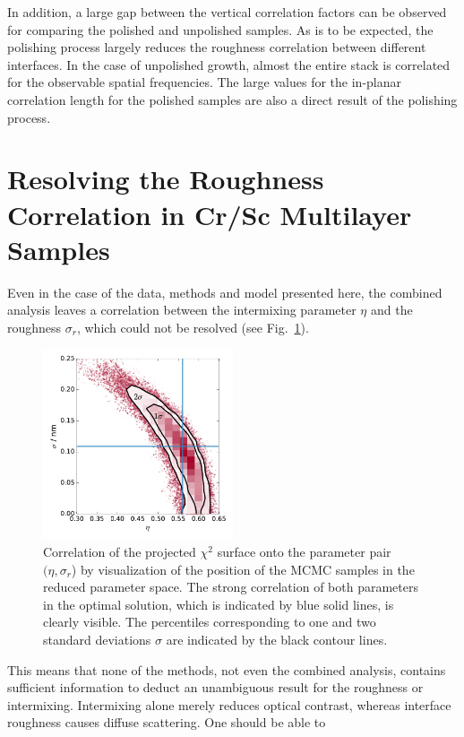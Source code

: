 In addition, a large gap between the vertical correlation factors can be observed for comparing the polished and unpolished samples. As is to be expected, the polishing process largely reduces the roughness correlation between different interfaces. In the case of unpolished growth, almost the entire stack is correlated for the observable spatial frequencies. The large values for the in-planar correlation length for the polished samples are also a direct result of the polishing process. 


\section{Resolving the Roughness Correlation in Cr/Sc Multilayer Samples}
Even in the case of the data, methods and model presented here, the combined 
analysis leaves a correlation between the intermixing parameter $\eta$ and the 
roughness $\sigma_r$, which could not be resolved (see 
Fig.~\ref{fig:eta_sigma_correlation}).
\begin{figure}[htbp]
  \centering
  \includegraphics[width=0.5\textwidth]{images/eta_sigma_correlation}
  \caption{Correlation of the projected $\chi^2$ surface onto the parameter 
pair $(\eta, \sigma_r$) by visualization of the position of the MCMC samples in 
the reduced parameter space. The strong correlation of both parameters in the 
optimal solution, which is indicated by blue solid lines, is clearly visible. 
The percentiles corresponding to one and two standard deviations $\sigma$ are 
indicated by the black contour lines.}
  \label{fig:eta_sigma_correlation}
\end{figure}
This means that none of the methods, not even the combined analysis, contains 
sufficient information to deduct an unambiguous result for the roughness or 
intermixing. Intermixing alone merely reduces optical contrast, whereas 
interface roughness causes diffuse scattering. One should be able to 

